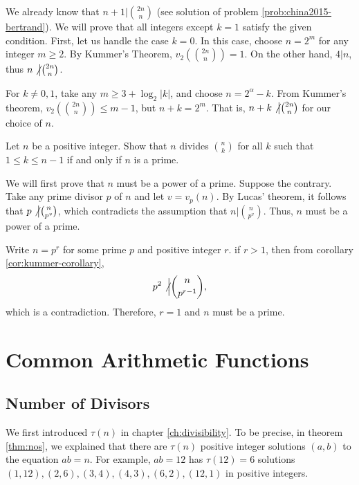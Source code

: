 \documentclass[12pt]{subfile}
\begin{document}
\begin{solution}
	We already know that $n+1 \big| \binom{2n}{n}$ (see solution of problem \eqref{prob:china2015-bertrand}). We will prove that all integers except $k=1$ satisfy the given condition. First, let us handle the case $k=0$. In this case, choose $n=2^m$ for any integer $m\geq 2$. By Kummer's Theorem, $v_2\left(\binom{2n}{n}\right)=1$. On the other hand, $4|n$, thus $	n \not \big| \binom{2n}{n}$.
	
	For $k \ne 0,1$, take any $m \geq 3 + {\log _2}\left| k \right|$, and choose $n = {2^\alpha } - k$. From Kummer's theorem, $v_2\left(\binom{2n}{n}\right) \leq m - 1$, but $n + k = {2^m}$. That is, $n+k \not \big| \binom{2n}{n}$ for our choice of $n$.
\end{solution}

\begin{problem}
	Let $n$ be a positive integer. Show that $n$ divides $\binom{n}{k}$ for all $k$ such that $1 \leq k \leq n-1$ if and only if $n$ is a prime.
\end{problem}

\begin{solution}
	We will first prove that $n$ must be a power of a prime. Suppose the contrary. Take any prime divisor $p$ of $n$ and let $v=v_p(n)$. By Lucas' theorem, it follows that $p \not\big| \binom{n}{p^v}$, which contradicts the assumption that $n \big| \binom{n}{p^v}$. Thus, $n$ must be a power of a prime. 
	
	Write $n=p^r$ for some prime $p$ and positive integer $r$. if $r>1$, then from corollary \eqref{cor:kummer-corollary},
	\begin{align*}
	p^2 \not \Big| \binom{n}{p^{r-1}},
	\end{align*}
	which is a contradiction. Therefore, $r=1$ and $n$ must be a prime.
	
\end{solution}

\section{Common Arithmetic Functions}
	\subsection{Number of Divisors}\label{sec:number-of-divisors}
		We first introduced $\tau(n)$ in chapter \eqref{ch:divisibility}. To be precise, in theorem \eqref{thm:nos}, we explained that there are $\tau(n)$ positive integer solutions $(a,b)$ to the equation $ab=n$. For example, $ab=12$ has $\tau(12)=6$ solutions $(1,12), (2, 6), (3,4), (4,3), (6,2), (12,1)$ in positive integers.
		
\end{document}

